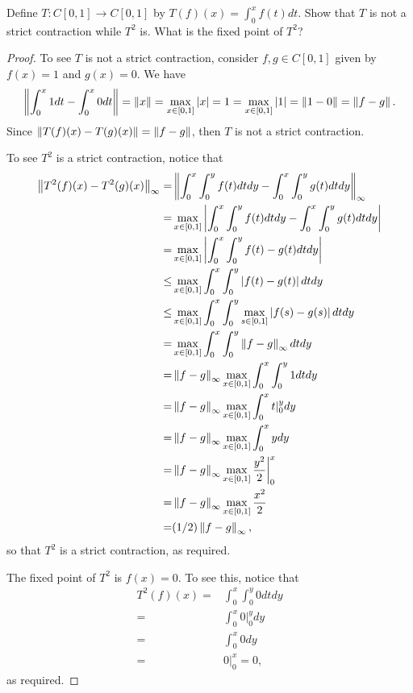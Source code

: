 \begin{exercise}{42}
Define $T:C[0,1]\to C[0,1]$ by $T(f)(x)=\int_0^x f(t)dt$.
Show that $T$ is not a strict contraction while $T^2$ is.
What is the fixed point of $T^2$?
\end{exercise}
\begin{proof}
To see $T$ is not a strict contraction, consider $f,g\in C[0,1]$ given by $f(x)=1$ and $g(x)=0$.
We have
\begin{align*}
    \left\lVert \int_0^x 1dt - \int_0^x 0dt\right\rVert 
    = \left\lVert x\right\rVert 
    = \max_{x\in[0,1]}\left\lvert x\right\rvert 
    = 1 
    = \max_{x\in[0,1]}\left\lvert 1\right\rvert 
    = \left\lVert 1- 0\right\rVert
    = \left\lVert f-g\right\rVert.
\end{align*}
Since $\left\lVert T(f)(x)-T(g)(x)\right\rVert = \left\lVert f-g\right\rVert$, then $T$ is not a strict contraction.

To see $T^2$ is a strict contraction, notice that
\begin{align*}
    \left\lVert T^2(f)(x) - T^2(g)(x)\right\rVert_\infty
    =& \left\lVert \int_0^x\int_0^y f(t)dtdy - \int_0^x\int_0^y g(t)dtdy\right\rVert_\infty\\
    =& \max_{x\in[0,1]}\left\lvert \int_0^x\int_0^y f(t)dtdy - \int_0^x\int_0^y g(t)dtdy\right\rvert\\
    =& \max_{x\in[0,1]}\left\lvert \int_0^x\int_0^y f(t)-g(t) dtdy\right\rvert\\
    \leq& \max_{x\in[0,1]}\int_0^x\int_0^y \left\lvert f(t)-g(t)\right\rvert dtdy\\
    \leq& \max_{x\in[0,1]}\int_0^x\int_0^y \max_{s\in[0,1]}\left\lvert f(s)-g(s)\right\rvert dtdy\\
    =& \max_{x\in[0,1]}\int_0^x\int_0^y \left\lVert f-g\right\rVert_\infty dtdy\\
    =& \left\lVert f-g\right\rVert_\infty \max_{x\in[0,1]}\int_0^x\int_0^y 1 dtdy\\
    =& \left\lVert f-g\right\rVert_\infty \max_{x\in[0,1]}\int_0^x t|^y_0 dy\\
    =& \left\lVert f-g\right\rVert_\infty \max_{x\in[0,1]}\int_0^x y dy\\
    =& \left\lVert f-g\right\rVert_\infty \max_{x\in[0,1]}\frac{y^2}{2}\bigg|_0^x\\
    =& \left\lVert f-g\right\rVert_\infty \max_{x\in[0,1]}\frac{x^2}{2}\\
    =& (1/2)\left\lVert f-g\right\rVert_\infty,
\end{align*}
so that $T^2$ is a strict contraction, as required.

The fixed point of $T^2$ is $f(x)=0$.
To see this, notice that
\begin{align*}
    T^2(f)(x)
    =& \int_0^x\int_0^y 0dtdy \\
    =& \int_0^x 0|^y_0 dy\\
    =& \int_0^x 0 dy\\
    =&  0|^x_0 = 0,
\end{align*}
as required.
\end{proof} 


